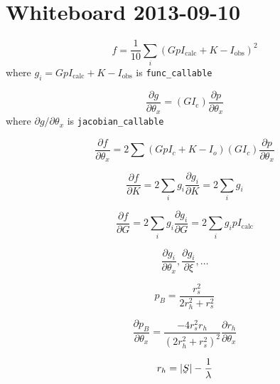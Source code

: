 \documentclass[12pt, letterpaper]{article}
\begin{document}

\section{Whiteboard 2013-09-10}

\begin{equation}
  f = \frac{1}{10} \sum_{i} \limits
    ( G  p I_{\mathrm{calc}} + K - I_{\mathrm{obs}})^{2}
\end{equation}
where $g_{i} = G p I_{\mathrm{calc}} + K - I_{\mathrm{obs}}$ is
\texttt{func\_callable}

\begin{equation}
  \frac{\partial g}{\partial \theta_{x}}
    = ( G I_{\mathrm{c}} ) \frac{\partial p}{\partial \theta_{x}}
\end{equation}
where $\partial g / \partial \theta_{x}$ is \texttt{jacobian\_callable}

\begin{equation}
  \frac{\partial f}{\partial \theta_{x}}
    = 2 \sum (G p I_{c} + K - I_{o}) (G I_{c})
        \frac{\partial p}{\partial \theta_{x}}
\end{equation}

\begin{equation}
  \frac{\partial f}{\partial K}
    = 2 \sum_{i} \limits g_{i} \frac{\partial g_{i}}{\partial K}
    = 2 \sum_{i} \limits g_{i}
\end{equation}

\begin{equation}
  \frac{\partial f}{\partial G}
    = 2 \sum_{i} \limits g_{i} \frac{\partial g_{i}}{\partial G}
    = 2 \sum_{i} \limits g_{i} p I_{\mathrm{calc}}
\end{equation}

\begin{equation}
  \frac{\partial g_{i}}{\partial \theta_{x}},
  \frac{\partial g_{i}}{\partial \xi},
  \ldots
\end{equation}

\begin{equation}
  p_{B} = \frac{r_{s}^{2}}{2 r_{h}^{2} + r_{s}^{2}}
\end{equation}

\begin{equation}
  \frac{\partial p_{B}}{\partial \theta_{x}}
    = \frac{-4 r_{s}^{2} r_{h}}{(2 r_{h}^{2} + r_{s}^{2})^{2}}
      \frac{\partial r_{h}}{\partial \theta_{x}}
\end{equation}

\begin{equation}
  r_{h} = | \underaccent{\tilde}{S} |  - \frac{1}{\lambda}
\end{equation}
\end{document}
